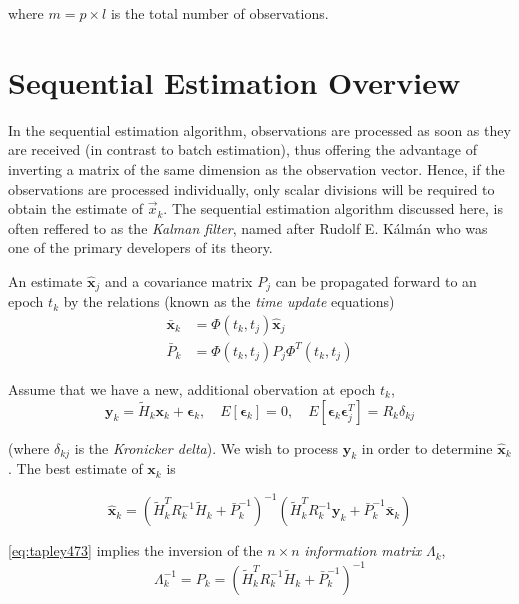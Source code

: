 where \( m = p \times l \) is the total number of observations.

\section{Sequential Estimation Overview}
In the sequential estimation algorithm, observations are processed as soon as they 
are received (in contrast to batch estimation), thus offering the advantage of 
inverting a matrix of the same dimension as the observation vector. Hence, if the 
observations are processed individually, only scalar divisions will be required to 
obtain the estimate of \(\vec{x}_k\). The sequential estimation algorithm discussed 
here, is often reffered to as the \emph{Kalman filter}, named after Rudolf E. K\'alm\'an
who was one of the primary developers of its theory. 

An estimate \(\hat{\bm{x}}_j \) and a covariance matrix \(P_j\) can be 
propagated forward to an epoch \(t_k\) by the relations (known as the 
\emph{time update} equations)
\begin{subequations}
\label{eq:tapley471}
\begin{align}
  \bar{\bm{x}} _k & = \Phi (t_k, t_j) \hat{\bm{x}}_j 
  \label{eq:tapley471a}\\
  \bar{P}_k & = \Phi (t_k, t_j) P_j \Phi ^T (t_k, t_j)
  \label{eq:tapley471b}
\end{align}
\end{subequations}


Assume that we have a new, additional obervation at epoch \(t_k\),
\begin{equation}
  \bm{y}_k = \tilde{H}_k \bm{x}_k + \bm{\epsilon} _k ,
  \quad E\left[\bm{\epsilon} _k \right] = 0,
  \quad E\left[\bm{\epsilon} _k \bm{\epsilon} ^T_j \right] = R_k \delta _{kj}
\end{equation}

(where \(\delta _{kj}\) is the \emph{Kronicker delta}). We wish to process 
\(\bm{y} _k\) in order to determine \(\hat{\bm{x}} _k\). The best estimate of 
\(\bm{x} _k\) is

\begin{equation}
\label{eq:tapley473}
\hat{\bm{x}} _k = \left( \tilde{H}^T_k R^{-1}_k \tilde{H}_k + \bar{P}^{-1}_k \right)^{-1} \left( \tilde{H}^T_k R^{-1}_k \bm{y}_k + \bar{P}^{-1}_k \bar{\bm{x}}_k \right)
\end{equation}

\ref{eq:tapley473} implies the inversion of the \(n \times n\) \emph{information matrix} \(\Lambda _k\), 
\begin{equation}
\label{eq:tapley474}
\Lambda ^{-1}_k = P_k = 
\left( \tilde{H}^T_k R^{-1}_k \tilde{H}_k + \bar{P}^{-1}_k \right)^{-1}
\end{equation}

